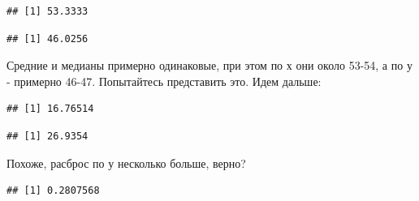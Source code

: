 \documentclass[]{book}
\newenvironment{Shaded}{\begin{snugshade}}{\end{snugshade}}
\newcommand{\KeywordTok}[1]{\textcolor[rgb]{0.13,0.29,0.53}{\textbf{#1}}}
\newcommand{\OperatorTok}[1]{\textcolor[rgb]{0.81,0.36,0.00}{\textbf{#1}}}
\newcommand{\NormalTok}[1]{#1}
\begin{document}
\begin{verbatim}
## [1] 53.3333
\end{verbatim}

\begin{Shaded}
\end{Shaded}

\begin{verbatim}
## [1] 46.0256
\end{verbatim}

Средние и медианы примерно одинаковые, при этом по х они около 53-54, а
по у - примерно 46-47. Попытайтесь представить это. Идем дальше:

\begin{Shaded}
\end{Shaded}

\begin{verbatim}
## [1] 16.76514
\end{verbatim}

\begin{Shaded}
\end{Shaded}

\begin{verbatim}
## [1] 26.9354
\end{verbatim}

Похоже, расброс по у несколько больше, верно?

\begin{Shaded}
\end{Shaded}

\begin{verbatim}
## [1] 0.2807568
\end{verbatim}

\begin{Shaded}
\end{Shaded}
\end{document}
